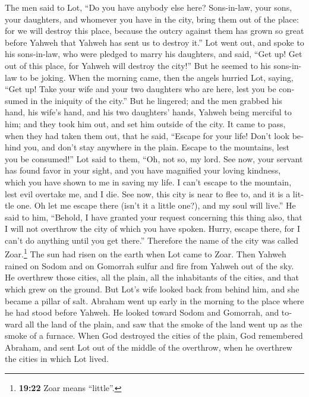 \begin{paracol}{2}
\begin{otherlanguage}{english}
 The men said to Lot, ``Do you have anybody else here?
Sons-in-law, your sons, your daughters, and whomever you have in the
city, bring them out of the place:  for we will destroy
this place, because the outcry against them has grown so great before
Yahweh that Yahweh has sent us to destroy it.''  Lot went
out, and spoke to his sons-in-law, who were pledged to marry his
daughters, and said, ``Get up! Get out of this place, for Yahweh will
destroy the city!'' But he seemed to his sons-in-law to be joking.
 When the morning came, then the angels hurried Lot,
saying, ``Get up! Take your wife and your two daughters who are here,
lest you be consumed in the iniquity of the city.''  But
he lingered; and the men grabbed his hand, his wife's hand, and his two
daughters' hands, Yahweh being merciful to him; and they took him out,
and set him outside of the city.  It came to pass, when
they had taken them out, that he said, ``Escape for your life! Don't
look behind you, and don't stay anywhere in the plain. Escape to the
mountains, lest you be consumed!''  Lot said to them,
``Oh, not so, my lord.  See now, your servant has found
favor in your sight, and you have magnified your loving kindness, which
you have shown to me in saving my life. I can't escape to the mountain,
lest evil overtake me, and I die.  See now, this city is
near to flee to, and it is a little one. Oh let me escape there (isn't
it a little one?), and my soul will live.''  He said to
him, ``Behold, I have granted your request concerning this thing also,
that I will not overthrow the city of which you have spoken.
 Hurry, escape there, for I can't do anything until you
get there.'' Therefore the name of the city was called Zoar.\footnote{\textbf{19:22}
  Zoar means ``little''.}  The sun had risen on the earth
when Lot came to Zoar.  Then Yahweh rained on Sodom and
on Gomorrah sulfur and fire from Yahweh out of the sky. 
He overthrew those cities, all the plain, all the inhabitants of the
cities, and that which grew on the ground.  But Lot's
wife looked back from behind him, and she became a pillar of salt.
 Abraham went up early in the morning to the place where
he had stood before Yahweh.  He looked toward Sodom and
Gomorrah, and toward all the land of the plain, and saw that the smoke
of the land went up as the smoke of a furnace.  When God
destroyed the cities of the plain, God remembered Abraham, and sent Lot
out of the middle of the overthrow, when he overthrew the cities in
which Lot lived.


\end{otherlanguage}
\end{paracol}
